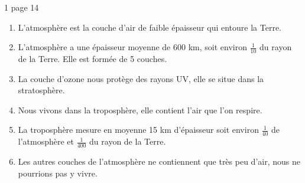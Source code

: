\begin{myact}{1 page 14}
	\begin{enumerate}
		\item L'atmosphère est la couche d'air de faible épaisseur qui entoure la Terre. \pause
		\item L'atmosphère a une épaisseur moyenne de 600 km, soit environ $\frac{1}{10}$ du rayon de la Terre. Elle est formée de 5 couches.\pause
		\item La couche d'ozone nous protège des rayons UV, elle se situe dans la stratosphère.\pause
		\item Nous vivons dans la troposphère, elle contient l'air que l'on respire.\pause
		\item La troposphère mesure en moyenne 15 km d'épaisseur soit environ $\frac{1}{40}$ de l'atmosphère et $\frac{1}{400}$ du rayon de la Terre.\pause
		\item Les autres couches de l'atmosphère ne contiennent que très peu d'air, nous ne pourrions pas y vivre. 
	\end{enumerate}
\end{myact}